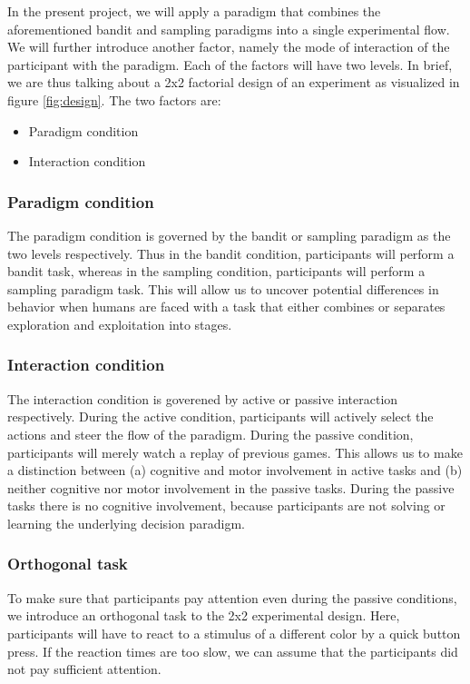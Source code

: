 \documentclass[
	12pt,
	oneside,
	bibliography=totocnumbered]{scrartcl}
\begin{document}
In the present project, we will apply a paradigm that combines the aforementioned bandit and sampling paradigms into a single experimental flow. We will further introduce another factor, namely the mode of interaction of the participant with the paradigm. Each of the factors will have two levels. In brief, we are thus talking about a 2x2 factorial design of an experiment as visualized in figure \ref{fig:design}. The two factors are:
\begin{itemize}
\item Paradigm condition
\item Interaction condition
\end{itemize}

\subsubsection{Paradigm condition}
The paradigm condition is governed by the bandit or sampling paradigm as the two levels respectively. Thus in the bandit condition, participants will perform a bandit task, whereas in the sampling condition, participants will perform a sampling paradigm task. This will allow us to uncover potential differences in behavior when humans are faced with a task that either combines or separates exploration and exploitation into stages.

\subsubsection{Interaction condition}
The interaction condition is goverened by active or passive interaction respectively. During the active condition, participants will actively select the actions and steer the flow of the paradigm. During the passive condition, participants will merely watch a replay of previous games. This allows us to make a distinction between (a) cognitive and motor involvement in active tasks and (b) neither cognitive nor motor involvement in the passive tasks. During the passive tasks there is no cognitive involvement, because participants are not solving or learning the underlying decision paradigm.

\subsubsection{Orthogonal task}
To make sure that participants pay attention even during the passive conditions, we introduce an orthogonal task to the 2x2 experimental design. Here, participants will have to react to a stimulus of a different color by a quick button press. If the reaction times are too slow, we can assume that the participants did not pay sufficient attention.
\end{document}
